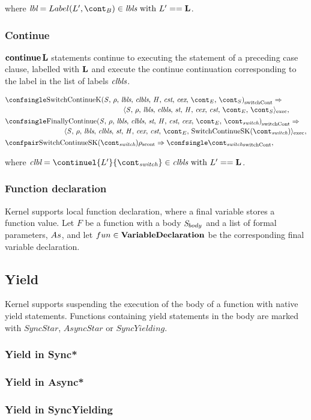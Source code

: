 \documentclass[a4paper,oneside]{article}
\newcommand{\synt}[1]{\ensuremath{\text{\textbf{#1}}}}
\DeclareMathOperator{\continue}{\synt{continue}}
\newcommand{\cesktrans}[2]{\ensuremath{{#1} \Rightarrow {#2}}}
\newcommand{\cesktranssplit}[2]{\ensuremath{{#1} \Rightarrow\\ {#2}}}
\begin{document}
\noindent where $\lbl = Label(L', \bcont) \in \lbls \text{ with } L' == \mathbf{L}$.


\subsubsection{Continue}

$\continue \synt{L}$ statements continue to executing the statement of a preceding case clause, labelled with $\synt{L}$ and execute the continue continuation corresponding to the label in the list of labels $\textit{clbls}$.

\begin{align*}
    &\begin{multlined}
        \cesktranssplit%
            {\switchconf{\ContinueK}}%
            {\execconf{\stmt}{\env}{\lbls}{\clbls}{\strace}{\handler}{\cex,\,\cstrace}{\econt}{\scont}},
    \end{multlined}\\
    &\begin{multlined}
        \cesktranssplit%
            {\switchconf{\FinallyContinue{\stmt}{\switchcont}}}%
            {\execconf{\stmt}{\env}{\lbls}{\clbls}{\strace}{\handler}{\cex,\,\cstrace}{\econt}{\mathrm{SwitchContinueSK}(\switchcont)}},
    \end{multlined}\\
    &\cesktrans%
        {\scontconf{\mathrm{SwitchContinueSK}(\switchcont)}{\env}}%
        {\switchconf{\switchcont}},
\end{align*}

\noindent where $\clbl = \continuel{L'}{\switchcont} \in \clbls \text{ with } L' == \mathbf{L}$.


\subsubsection{Function declaration}

Kernel supports local function declaration, where a final variable stores a function value.
Let $F$ be a function with a body $\mathit{S}_{body}$ and a list of formal parameters, $As$, and let $fun \in \mathbf{VariableDeclaration}$ be the corresponding final variable declaration.


\subsection{Yield}

Kernel supports suspending the execution of the body of a function with native yield statements.
Functions containing yield statements in the body are marked with $SyncStar$, $AsyncStar$ or $SyncYielding$.


\subsubsection{Yield in Sync*}
\label{subsubsec:yeld-in-syncstar}
\subsubsection{Yield in Async*}
\label{subsubsec:yield-in-asyncstar}
\subsubsection{Yield in SyncYielding}
\label{subsubsec:yield-in-syncyelding}
\end{document}
